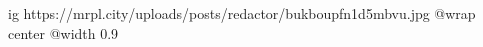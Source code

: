  
 
 
 
 

\ifcmt
  ig https://mrpl.city/uploads/posts/redactor/bukboupfn1d5mbvu.jpg
  @wrap center
  @width 0.9
\fi
